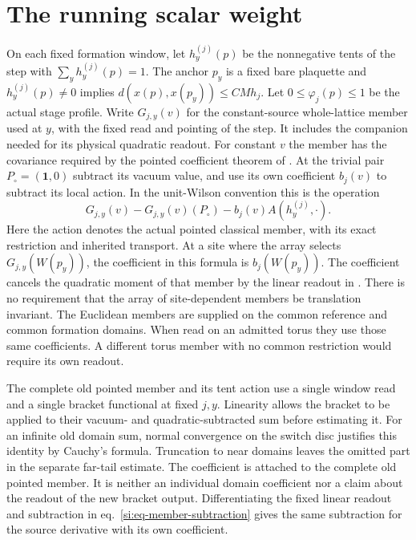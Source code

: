 \documentclass[11pt,letterpaper,reqno]{amsart}
\numberwithin{equation}{section}
\renewcommand{\eqref}[1]{\textup{eq.~\ref{#1}}}
\theoremstyle{definition}
\theoremstyle{remark}
\begin{document}
\section{The running scalar weight}\label{si:sec-running-profiles}

On each fixed formation window, let $h_y^{(j)}(p)$ be the nonnegative
tents of the step with $\sum_y h_y^{(j)}(p)=1$. The anchor $p_y$ is a
fixed bare plaquette and $h_y^{(j)}(p)\ne0$ implies
$d(x(p),x(p_y))\le C M h_j$. Let $0\le\varphi_j(p)\le1$ be the
actual stage profile. Write $G_{j,y}(v)$ for the constant-source
whole-lattice member used at $y$, with the fixed read and pointing
of the step. It includes the companion needed for its physical
quadratic readout. For constant $v$ the member has the covariance
required by the pointed coefficient theorem of \cite{EM}. At the
trivial pair $P_\circ=(\mathbf1,0)$ subtract its vacuum value, and
use its own coefficient $b_j(v)$ to subtract its local action.
In the unit-Wilson convention this is the operation
\begin{equation}\label{si:eq-member-subtraction}
 G_{j,y}(v)-G_{j,y}(v)(P_\circ)
                 -b_j(v)A(h_y^{(j)},\cdot).
\end{equation}
Here the action denotes the actual pointed classical member, with
its exact restriction and inherited transport. At a site where the
array selects $G_{j,y}(W(p_y))$, the coefficient in this formula is
$b_j(W(p_y))$. The coefficient cancels the quadratic moment of that
member by the linear readout in \cite{EM}. There is no requirement
that the array of site-dependent members be translation invariant.
The Euclidean members are supplied on the common reference and
common formation domains. When read on an admitted torus they use
those same coefficients. A different torus member with no common
restriction would require its own readout.

The complete old pointed member and its tent action use a single
window read and a single bracket functional at fixed $j,y$. Linearity
allows the bracket to be applied to their vacuum- and
quadratic-subtracted sum before estimating it. For an infinite old
domain sum, normal convergence on the switch disc justifies this
identity by Cauchy's formula. Truncation to near domains leaves the
omitted part in the separate far-tail estimate. The coefficient is
attached to the complete old pointed member. It is neither an
individual domain coefficient nor a claim about the readout of
the new bracket output. Differentiating the fixed linear readout
and subtraction in \eqref{si:eq-member-subtraction} gives the same
subtraction for the source derivative with its own coefficient.
\end{document}

